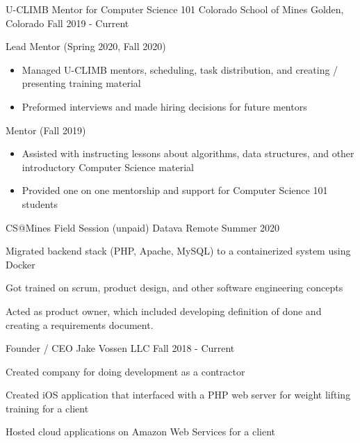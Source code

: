 \begin{cventries}
    \cventry
    	{U-CLIMB Mentor for Computer Science 101}
    	{ Colorado School of Mines }
    	{ Golden, Colorado}
	   	 {Fall 2019 - Current}
   	 {
   	 \begin{cvitems}
         \item {Lead Mentor (Spring 2020, Fall 2020)}
         \begin{itemize}
         \item {Managed U-CLIMB mentors, scheduling, task
    	distribution, and creating /
      presenting training material}
          \item {Preformed interviews and made hiring decisions for future mentors}
         \end{itemize}
         \ifcv
         \item {Mentor (Fall 2019)}
         \begin{itemize}
            	 \item {Assisted with instructing lessons about algorithms, data structures, and other introductory Computer Science material}
   	         \item {Provided one on one mentorship and support for
    	Computer Science 101 students}
        \end{itemize}
        \fi
      \end{cvitems}
      }

      \ifcv
    \cventry
    {CS@Mines Field Session (unpaid)}
    {Datava}
    {Remote}
    {Summer 2020}
    {
      \begin{cvitems}
        \item Migrated backend stack (PHP, Apache, MySQL) to a containerized system using Docker
        \item Got trained on scrum, product design, and other software engineering concepts
        \item Acted as product owner, which included developing definition of done and creating a requirements document.
      \end{cvitems}
    }

    \cventry
    {Founder / CEO}
    { Jake Vossen LLC }
    {}
    {Fall 2018 - Current}
    {
      \begin{cvitems}
        \item {Created company for doing development as a contractor}
        \item {Created iOS application that interfaced with a PHP web server for weight lifting training for a client}
        \item {Hosted cloud applications on Amazon Web Services for a client}
      \end{cvitems}
    }
    


\end{cventries}
